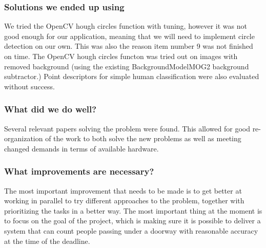 \subsubsection{Solutions we ended up using}
We tried the OpenCV hough circles function with tuning, however it was not good enough for our application, meaning that we will need to implement circle detection on our own. This was also the reason item number 9 was not finished on time. The OpenCV hough circles functon was tried out on images with removed background (using the existing BackgroundModelMOG2 background subtractor.) Point descriptors for simple human classification were also evaluated without success.

\subsubsection{What did we do well?}
Several relevant papers solving the problem were found. This allowed for good re-organization of the work to both solve the new problems as well as meeting changed demands in terms of available hardware.

\subsubsection{What improvements are necessary?}
The most important improvement that needs to be made is to get better at working in parallel to try different approaches to the problem, together with prioritizing the tasks in a better way. The most important thing at the moment is to focus on the goal of the project, which is making sure it is possible to deliver a system that can count people passing under a doorway with reasonable accuracy at the time of the deadline.

\newpage

\resulttable
{

}

